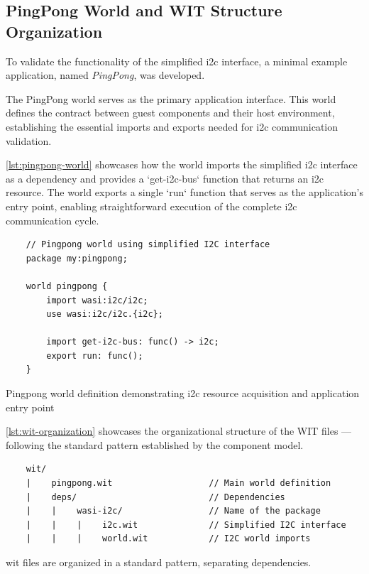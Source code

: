 \subsection{PingPong World and WIT Structure Organization}
\label{subsec:pingpong}

To validate the functionality of the simplified \acrshort{i2c} interface, a minimal example application, named \emph{PingPong}, was developed.

The PingPong world serves as the primary application interface. This world defines the contract between guest components and their host environment, establishing the essential imports and exports needed for \acrshort{i2c} communication validation.

\autoref{lst:pingpong-world} showcases how the world imports the simplified \acrshort{i2c} interface as a dependency and provides a `get-i2c-bus` function that returns an \acrshort{i2c} resource. The world exports a single `run` function that serves as the application's entry point, enabling straightforward execution of the complete \acrshort{i2c} communication cycle.

\begin{listing}[htbp]
    \begin{verbatim}
    // Pingpong world using simplified I2C interface
    package my:pingpong;
    
    world pingpong {
        import wasi:i2c/i2c;
        use wasi:i2c/i2c.{i2c};
    
        import get-i2c-bus: func() -> i2c;
        export run: func();
    }
    \end{verbatim}
    \caption{Pingpong world definition demonstrating \acrshort{i2c} resource acquisition and application entry point}
    \label{lst:pingpong-world}
\end{listing}

\autoref{lst:wit-organization} showcases the organizational structure of the WIT files --- following the standard pattern established by the component model.
\begin{listing}[H]
    \begin{verbatim}
    wit/
    |    pingpong.wit                   // Main world definition
    |    deps/                          // Dependencies
    |    |    wasi-i2c/                 // Name of the package
    |    |    |    i2c.wit              // Simplified I2C interface
    |    |    |    world.wit            // I2C world imports
    \end{verbatim}
    \caption{\acrshort{wit} files are organized in a standard pattern, separating dependencies.}
    \label{lst:wit-organization}
\end{listing}


